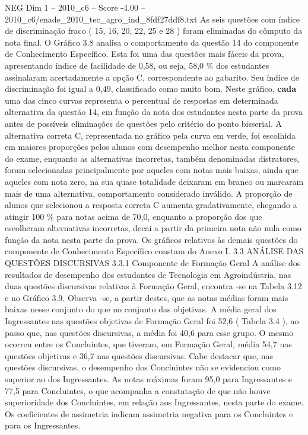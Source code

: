 \begin{textsample}{NEG Dim 1 – 2010\_c6 – Score -4.00 – 2010\_c6/enade\_2010\_tec\_agro\_ind\_8fdf27ddf8.txt}
As seis questões com índice de discriminação fraco ( 15, 16, 20, 22, 25 e 28 ) foram eliminadas do cômputo da nota final.
O Gráfico 3.8 analisa o comportamento da questão 14 do componente de Conhecimento Específico.
Esta foi uma das questões mais fáceis da prova, apresentando índice de facilidade de 0,58, ou seja, 58,0 \% dos estudantes assinalaram acertadamente a opção C, correspondente ao gabarito.
Seu índice de discriminação foi igual a 0,49, classificado como muito bom.
Neste gráfico, \textbf{cada} uma das cinco curvas representa o percentual de respostas em determinada alternativa da questão 14, em função da nota dos estudantes nesta parte da prova antes de possíveis eliminações de questões pelo critério do ponto bisserial.
A alternativa correta C, representada no gráfico pela curva em verde, foi escolhida em maiores proporções pelos alunos com desempenho melhor nesta componente do exame, enquanto as alternativas incorretas, também denominadas distratores, foram selecionadas principalmente por aqueles com notas mais baixas, ainda que aqueles com nota zero, na sua quase totalidade deixaram em branco ou marcaram mais de uma alternativa, comportamento considerado inválido.
A proporção de alunos que selecionou a resposta correta C aumenta gradativamente, chegando a atingir 100 \% para notas acima de 70,0, enquanto a proporção dos que escolheram alternativas incorretas, decai a partir da primeira nota não nula como função da nota nesta parte da prova.
Os gráficos relativos às demais questões do componente de Conhecimento Específico constam do Anexo I. 3.3 ANÁLISE DAS QUESTÕES DISCURSIVAS 3.3.1 Componente de Formação Geral A análise dos resultados de desempenho dos estudantes de Tecnologia em Agroindústria, nas duas questões discursivas relativas à Formação Geral, encontra -se na Tabela 3.12 e no Gráfico 3.9.
Observa -se, a partir destes, que as notas médias foram mais baixas nesse conjunto do que no conjunto das objetivas.
A média geral dos Ingressantes nas questões objetivas de Formação Geral foi 52,6 ( Tabela 3.4 ), ao passo que, nas questões discursivas, a média foi 40,6 para esse grupo.
O mesmo ocorreu entre os Concluintes, que tiveram, em Formação Geral, média 54,7 nas questões objetivas e 36,7 nas questões discursivas.
Cabe destacar que, nas questões discursivas, o desempenho dos Concluintes não se evidenciou como superior ao dos Ingressantes.
As notas máximas foram 95,0 para Ingressantes e 77,5 para Concluintes, o que acompanha a constatação de que não houve superioridade dos Concluintes, em relação aos Ingressantes, nesta parte do exame.
Os coeficientes de assimetria indicam assimetria negativa para os Concluintes e para os Ingressantes.

\end{textsample}
